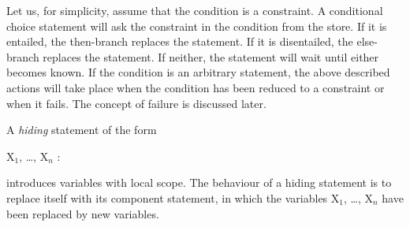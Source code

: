 Let us, for simplicity, assume that the condition is a constraint.  A
conditional choice statement will ask the constraint in the condition
from the store.  If it is entailed, the then-branch replaces the
statement.  If it is disentailed, the else-branch replaces the
statement.  If neither, the statement will wait until either becomes
known.  If the condition is an arbitrary statement, the above
described actions will take place when the condition has been reduced
to a constraint or when it fails.  The concept of failure is discussed
later.

A {\em hiding} statement of the form
%
\begin{progex}
X$_1$, \dots, X$_n$ : 
\end{progex}%
%
introduces variables with local scope.  The behaviour of a hiding
statement is to replace itself with its component statement, in which
the variables {\prog X$_1$, \dots, X$_n$} have been replaced by new
variables.


